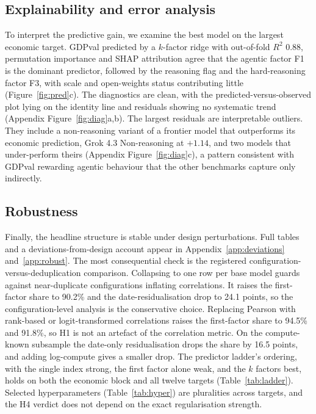 


\FloatBarrier
\subsection{Explainability and error analysis}\label{sec:explain}
To interpret the predictive gain, we examine the best model on the largest economic target. GDPval predicted by a $k$-factor ridge with
out-of-fold $R^2$ 0.88, permutation importance and SHAP attribution \cite{lundberg2017} agree that the
agentic factor F1 is the dominant predictor, followed by the reasoning flag and the hard-reasoning
factor F3, with scale and open-weights status contributing little (Figure~\ref{fig:pred}c). The
diagnostics are clean, with the predicted-versus-observed plot lying on the identity line and residuals
showing no systematic trend (Appendix Figure~\ref{fig:diag}a,b). The largest residuals are interpretable outliers.
They include a non-reasoning variant of a frontier model that outperforms its
economic prediction, Grok 4.3 Non-reasoning at $+1.14$, and two models that under-perform theirs
(Appendix Figure~\ref{fig:diag}c), a pattern consistent with GDPval rewarding agentic behaviour that the other
benchmarks capture only indirectly.

\subsection{Robustness}\label{sec:robustness}
Finally, the headline structure is stable under design perturbations. Full tables and a deviations-from-design
account appear in Appendix~\ref{app:deviations} and~\ref{app:robust}. The most
consequential check is the registered configuration-versus-deduplication comparison. Collapsing to one
row per base model guards against near-duplicate configurations inflating correlations. It raises the
first-factor share to 90.2\% and the date-residualisation drop to 24.1 points, so the configuration-level
analysis is the conservative choice. Replacing Pearson with rank-based or logit-transformed correlations raises
the first-factor share to 94.5\% and 91.8\%, so H1 is not an artefact of the correlation
metric. On the compute-known subsample the date-only residualisation drops the share by 16.5 points, and
adding log-compute gives a smaller drop. The predictor ladder's ordering,
with the single index strong, the first factor alone weak, and the $k$ factors best, holds on both the
economic block and all twelve targets (Table~\ref{tab:ladder}). Selected hyperparameters (Table~\ref{tab:hyper}) are pluralities across targets, and the H4 verdict does not depend on the exact regularisation strength.

